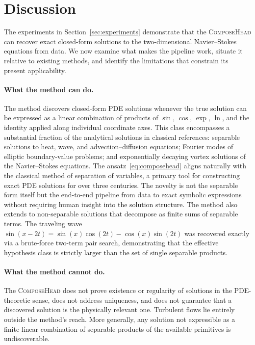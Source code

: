 \section{Discussion}
\label{sec:discussion}

The experiments in Section~\ref{sec:experiments} demonstrate that the
\textsc{ComposeHead} can recover exact closed-form solutions to the
two-dimensional Navier--Stokes equations from data.  We now examine what makes
the pipeline work, situate it relative to existing methods, and identify the
limitations that constrain its present applicability.

\paragraph{What the method can do.}
The method discovers closed-form PDE solutions whenever the true solution can be
expressed as a linear combination of products of $\sin$, $\cos$, $\exp$, $\ln$,
and the identity applied along individual coordinate axes.  This class
encompasses a substantial fraction of the analytical solutions in classical
references: separable solutions to heat, wave, and advection--diffusion
equations; Fourier modes of elliptic boundary-value problems; and exponentially
decaying vortex solutions of the Navier--Stokes equations.  The
ansatz~\eqref{eq:composehead} aligns naturally with the classical method of
separation of variables, a primary tool for constructing exact PDE solutions for
over three centuries.  The novelty is not the separable form itself but the
end-to-end pipeline from data to exact symbolic expressions without requiring
human insight into the solution structure.  The method also extends to
non-separable solutions that decompose as finite sums of separable terms.  The
traveling wave $\sin(x - 2t) = \sin(x)\cos(2t) - \cos(x)\sin(2t)$ was
recovered exactly via a brute-force two-term pair search, demonstrating that
the effective hypothesis class is strictly larger than the set of single
separable products.

\paragraph{What the method cannot do.}
The \textsc{ComposeHead} does not prove existence or regularity of solutions in
the PDE-theoretic sense, does not address uniqueness, and does not guarantee
that a discovered solution is the physically relevant one.  Turbulent flows lie
entirely outside the method's reach.  More generally, any solution not
expressible as a finite linear combination of separable products of the
available primitives is undiscoverable.

